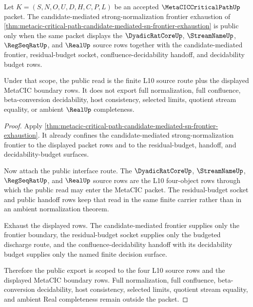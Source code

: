 \begin{theorem}
\label{thm:metacic-critical-path-candidate-mediated-sn-frontier-exhaustion-scope}
Let $K=(S,N,O,U,D,H,C,P,L)$ be an accepted $\MetaCICCriticalPathUp$ packet. The candidate-mediated strong-normalization frontier exhaustion of \autoref{thm:metacic-critical-path-candidate-mediated-sn-frontier-exhaustion} is public only when the same packet displays the $\DyadicRatCoreUp$, $\StreamNameUp$, $\RegSeqRatUp$, and $\RealUp$ source rows together with the candidate-mediated frontier, residual-budget socket, confluence-decidability handoff, and decidability budget rows.

Under that scope, the public read is the finite L10 source route plus the displayed MetaCIC boundary rows. It does not export full normalization, full confluence, beta-conversion decidability, host consistency, selected limits, quotient stream equality, or ambient $\RealUp$ completeness.
\end{theorem}
\begin{proof}
Apply \autoref{thm:metacic-critical-path-candidate-mediated-sn-frontier-exhaustion}. It already confines the candidate-mediated strong-normalization frontier to the displayed packet rows and to the residual-budget, handoff, and decidability-budget surfaces.

Now attach the public interface route. The $\DyadicRatCoreUp$, $\StreamNameUp$, $\RegSeqRatUp$, and $\RealUp$ source rows are the L10 four-object rows through which the public read may enter the MetaCIC packet. The residual-budget socket and public handoff rows keep that read in the same finite carrier rather than in an ambient normalization theorem.

Exhaust the displayed rows. The candidate-mediated frontier supplies only the frontier boundary, the residual-budget socket supplies only the budgeted discharge route, and the confluence-decidability handoff with its decidability budget supplies only the named finite decision surface.

Therefore the public export is scoped to the four L10 source rows and the displayed MetaCIC boundary rows. Full normalization, full confluence, beta-conversion decidability, host consistency, selected limits, quotient stream equality, and ambient Real completeness remain outside the packet.
\end{proof}
